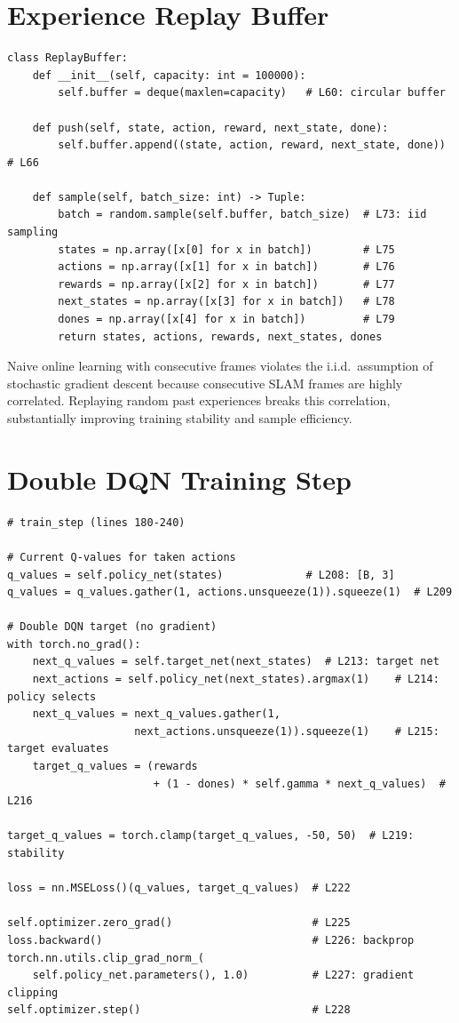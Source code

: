 \documentclass[12pt,a4paper,twoside]{report}
\theoremstyle{definition}
\begin{document}
\section{Experience Replay Buffer}

\begin{lstlisting}
class ReplayBuffer:
    def __init__(self, capacity: int = 100000):
        self.buffer = deque(maxlen=capacity)   # L60: circular buffer

    def push(self, state, action, reward, next_state, done):
        self.buffer.append((state, action, reward, next_state, done))  # L66

    def sample(self, batch_size: int) -> Tuple:
        batch = random.sample(self.buffer, batch_size)  # L73: iid sampling
        states = np.array([x[0] for x in batch])        # L75
        actions = np.array([x[1] for x in batch])       # L76
        rewards = np.array([x[2] for x in batch])       # L77
        next_states = np.array([x[3] for x in batch])   # L78
        dones = np.array([x[4] for x in batch])         # L79
        return states, actions, rewards, next_states, dones
\end{lstlisting}

\begin{notebox}
Naive online learning with consecutive frames violates the i.i.d.\ assumption
of stochastic gradient descent because consecutive SLAM frames are highly
correlated. Replaying random past experiences breaks this correlation,
substantially improving training stability and sample efficiency.
\end{notebox}

\section{Double DQN Training Step}

\begin{lstlisting}
# train_step (lines 180-240)

# Current Q-values for taken actions
q_values = self.policy_net(states)             # L208: [B, 3]
q_values = q_values.gather(1, actions.unsqueeze(1)).squeeze(1)  # L209

# Double DQN target (no gradient)
with torch.no_grad():
    next_q_values = self.target_net(next_states)  # L213: target net
    next_actions = self.policy_net(next_states).argmax(1)    # L214: policy selects
    next_q_values = next_q_values.gather(1,
                    next_actions.unsqueeze(1)).squeeze(1)    # L215: target evaluates
    target_q_values = (rewards
                       + (1 - dones) * self.gamma * next_q_values)  # L216

target_q_values = torch.clamp(target_q_values, -50, 50)  # L219: stability

loss = nn.MSELoss()(q_values, target_q_values)  # L222

self.optimizer.zero_grad()                      # L225
loss.backward()                                 # L226: backprop
torch.nn.utils.clip_grad_norm_(
    self.policy_net.parameters(), 1.0)          # L227: gradient clipping
self.optimizer.step()                           # L228
\end{lstlisting}
\end{document}
